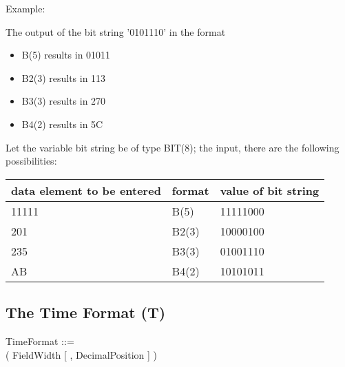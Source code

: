 Example:

The output of the bit string '0101110' in the format

\begin{itemize}
\item B(5) results in 01011 
\item B2(3) results in 113 
\item B3(3) results in 270 
\item B4(2) results in 5C
\end{itemize}

Let the variable bit string be of type BIT(8); the input, there are the
following possibilities:

\begin{tabular}{lll}
data element to be entered & format & value of bit string \\ \hline
11111                      & B(5)   &         11111000    \\
201                        & B2(3)  &         10000100    \\
235                        & B3(3)  &         01001110    \\
AB                         & B4(2)  &         10101011
\end{tabular}

\subsection{The Time Format (T)}   %
\label{sec_dation_t_format}

TimeFormat ::= \\
 ( FieldWidth [ , DecimalPosition ] )

